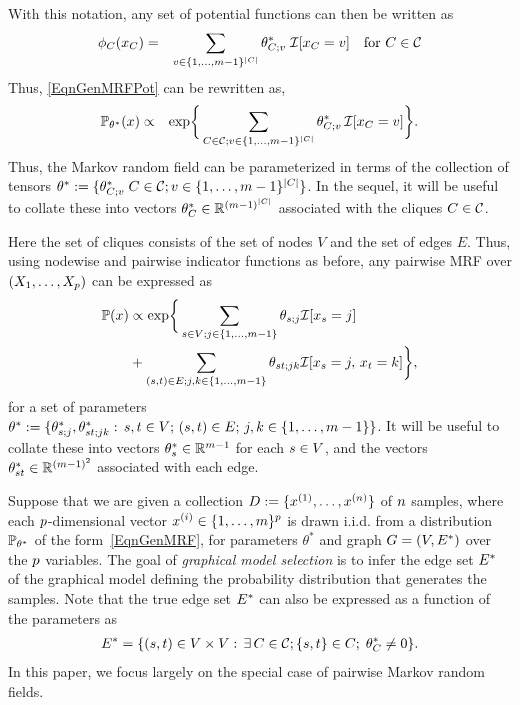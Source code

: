 \noindent With this notation, any set of potential functions can then be written as
\begin{eqnarray*}
\phi_{C}(x_C) & = & \sum_{v \in \{1, \ldots, m-1 \}^{|C|}}
	\theta^*_{C;v} \; \mathcal{I}[x_C = v] \quad \mbox{for $C \in \mathcal{C}$}
\end{eqnarray*}
Thus, \eqref{EqnGenMRFPot} can be rewritten as,
\begin{align}
\label{EqnGenMRF}
\mathbb{P}_{\theta^*}(x) & \propto & \exp \biggr \{\sum_{C \in \mathcal{C}; v \in \{1, \ldots, m-1 \}^{|C|}} \theta^*_{C;v} \, \mathcal{I}[x_C = v] \biggr \}.
\end{align}
Thus, the Markov random field can be parameterized in terms of the collection of tensors $\theta^* := \{\theta^*_{C;v} \; C \in \mathcal{C}; v \in \{1, \ldots, m-1 \}^{|C|}\}$. In the sequel, it will be useful to collate these into vectors $\theta^*_{C} \in \mathbb{R}^{(m-1)^{|C|}}$ associated with the cliques $C \in \mathcal{C}$. 

 Here the set of cliques consists of the set of nodes $V$ and the set of edges $E$. Thus,
using nodewise and pairwise indicator functions as before, any pairwise MRF over $(X_1, \ldots, X_p)$
can be expressed as
\begin{align}
\label{EqnGenMRFPairwise}
\nonumber \mathbb{P}(x)  &\propto  \exp \biggr \{\sum_{s \in V; j \in \{1, \ldots, m-1 \}} \theta_{s;j}\mathcal{I}[x_s = j] 
	\\
& + \sum_{(s,t) \in E; j,k \in \{1, \ldots, m-1 \}} \theta_{st;jk} \mathcal{I}[x_s = j,\,x_t = k] \biggr \},
\end{align}
for a set of parameters $\theta^* := \{\theta^*_{s;j}, \theta^*_{st;jk} :\, s,t \in V;\, (s,t) \in E;\, j,k \in \{1, \ldots, m-1 \}\}$.
It will be useful to collate these into vectors $\theta^*_s \in \mathbb{R}^{m-1}$ for each $s \in V$, and the vectors $\theta^*_{st} \in \mathbb{R}^{(m-1)^2}$ associated with each edge.

 Suppose that we are given a collection $D := \{x^{(1)}, \ldots, x^{(n)} \}$ of $n$ samples, where each
$p$-dimensional vector  $x^{(i)} \in \{1,\ldots,m\}^p$ is drawn i.i.d. from a distribution $\mathbb{P}_{\theta^*}$ of the
form~\eqref{EqnGenMRF}, for parameters $\theta^*$ and graph $G = (V, E^*)$ over the $p$ variables. 
The goal of \emph{graphical model selection} is to infer the edge set $E^*$ of the graphical model defining the probability distribution that generates the samples. Note that the true edge set $E^*$ can also be expressed as a function of the parameters as
\begin{eqnarray}
\label{EqnEdge}
E^* = \{(s,t) \in V \times V :\, \exists \, C \in \mathcal{C}; \{s,t\} \in C;\; \theta^*_{C} \neq 0 \}.
\end{eqnarray}
In this paper, we focus largely on the special case of pairwise Markov random fields.

